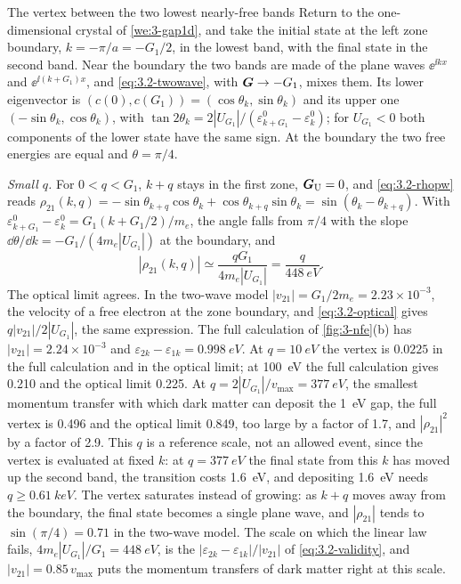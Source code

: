 \begin{workedexample}{The vertex between the two lowest nearly-free bands}\label{we:3-vertex}
Return to the one-dimensional crystal of \cref{we:3-gap1d}, and take the initial state at the left zone boundary, $k = -\pi/a = -G_1/2$, in the lowest band, with the final state in the second band. Near the boundary the two bands are made of the plane waves $\ee^{\ii kx}$ and $\ee^{\ii(k+G_1)x}$, and \cref{eq:3.2-twowave}, with $\bm{G} \to -G_1$, mixes them. Its lower eigenvector is $(c(0), c(G_1)) = (\cos\theta_k, \sin\theta_k)$ and its upper one $(-\sin\theta_k, \cos\theta_k)$, with $\tan2\theta_k = 2|U_{G_1}|/(\varepsilon^0_{k+G_1} - \varepsilon^0_k)$; for $U_{G_1} < 0$ both components of the lower state have the same sign. At the boundary the two free energies are equal and $\theta = \pi/4$.

\emph{Small $q$.} For $0 < q < G_1$, $k + q$ stays in the first zone, $\bm{G}_{\mathrm{U}} = 0$, and \cref{eq:3.2-rhopw} reads $\rho_{21}(k,q) = -\sin\theta_{k+q}\cos\theta_k + \cos\theta_{k+q}\sin\theta_k = \sin(\theta_k - \theta_{k+q})$. With $\varepsilon^0_{k+G_1} - \varepsilon^0_k = G_1(k + G_1/2)/m_e$, the angle falls from $\pi/4$ with the slope $\dd\theta/\dd k = -G_1/(4m_e|U_{G_1}|)$ at the boundary, and
\begin{equation*}
  |\rho_{21}(k,q)| \simeq \frac{qG_1}{4m_e|U_{G_1}|} = \frac{q}{\SI{448}{eV}} .
\end{equation*}
The optical limit agrees. In the two-wave model $|v_{21}| = G_1/2m_e = 2.23\times10^{-3}$, the velocity of a free electron at the zone boundary, and \cref{eq:3.2-optical} gives $q|v_{21}|/2|U_{G_1}|$, the same expression. The full calculation of \cref{fig:3-nfe}(b) has $|v_{21}| = 2.24\times10^{-3}$ and $\varepsilon_{2k} - \varepsilon_{1k} = \SI{0.998}{eV}$. At $q = \SI{10}{eV}$ the vertex is $0.0225$ in the full calculation and in the optical limit; at \SI{100}{eV} the full calculation gives 0.210 and the optical limit 0.225. At $q = 2|U_{G_1}|/v_{\mathrm{max}} = \SI{377}{eV}$, the smallest momentum transfer with which dark matter can deposit the \SI{1}{eV} gap, the full vertex is 0.496 and the optical limit 0.849, too large by a factor of 1.7, and $|\rho_{21}|^2$ by a factor of 2.9. This $q$ is a reference scale, not an allowed event, since the vertex is evaluated at fixed $k$: at $q = \SI{377}{eV}$ the final state from this $k$ has moved up the second band, the transition costs \SI{1.6}{eV}, and depositing \SI{1.6}{eV} needs $q \ge \SI{0.61}{keV}$. The vertex saturates instead of growing: as $k + q$ moves away from the boundary, the final state becomes a single plane wave, and $|\rho_{21}|$ tends to $\sin(\pi/4) = 0.71$ in the two-wave model. The scale on which the linear law fails, $4m_e|U_{G_1}|/G_1 = \SI{448}{eV}$, is the $|\varepsilon_{2k} - \varepsilon_{1k}|/|v_{21}|$ of \cref{eq:3.2-validity}, and $|v_{21}| = 0.85\,v_{\mathrm{max}}$ puts the momentum transfers of dark matter right at this scale.


\end{workedexample}
